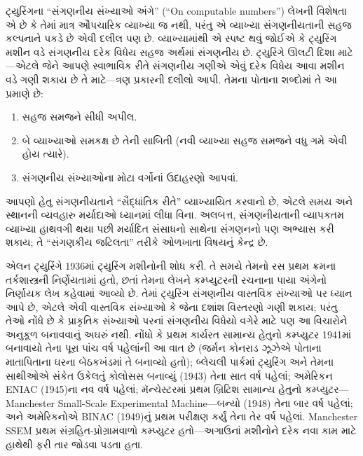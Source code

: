 \begin{digress}
ટ્યુરિંગના ``સંગણનીય સંખ્યાઓ અંગે'' (``On computable numbers'') લેખની
વિશેષતા એ છે કે તેમાં
માત્ર ઔપચારિક વ્યાખ્યા જ નથી, પરંતુ એ વ્યાખ્યા સંગણનીયતાની
સહજ કલ્પનાને પકડે છે એવી દલીલ પણ છે. વ્યાખ્યામાંથી એ સ્પષ્ટ
થવું જોઈએ કે ટ્યુરિંગ મશીન વડે સંગણનીય દરેક વિધેય સહજ અર્થમાં
સંગણનીય છે. ટ્યુરિંગે ઊલટી દિશા માટે---એટલે જેને આપણે
સ્વાભાવિક રીતે સંગણનીય ગણીએ એવું દરેક વિધેય આવા મશીન વડે
ગણી શકાય છે તે માટે---ત્રણ પ્રકારની દલીલો આપી. તેમના પોતાના
શબ્દોમાં તે આ પ્રમાણે છે:
\begin{enumerate}
\item સહજ સમજને સીધી અપીલ.
\item બે વ્યાખ્યાઓ સમકક્ષ છે તેની સાબિતી (નવી વ્યાખ્યા સહજ
  સમજને વધુ ગમે એવી હોય ત્યારે).
\item સંગણનીય સંખ્યાઓના મોટા વર્ગોનાં ઉદાહરણો આપવાં.
\end{enumerate}
આપણો હેતુ સંગણનીયતાને ``સૈદ્ધાંતિક રીતે'' વ્યાખ્યાયિત કરવાનો
છે, એટલે સમય અને સ્થાનની વ્યવહારુ મર્યાદાઓ ધ્યાનમાં લીધા
વિના. અલબત્ત, સંગણનીયતાની વ્યાપકતમ વ્યાખ્યા હાથવગી થયા
પછી મર્યાદિત સંસાધનો સાથેના સંગણનનો પણ અભ્યાસ કરી શકાય;
તે ``સંગણકીય જટિલતા'' તરીકે ઓળખાતા વિષયનું કેન્દ્ર છે.
\end{digress}

\begin{history}
એલન ટ્યુરિંગે 1936માં ટ્યુરિંગ મશીનોની શોધ કરી. તે સમયે તેમનો
રસ પ્રથમ ક્રમના તર્કશાસ્ત્રની નિર્ણેયતામાં હતો, છતાં તેમના
લેખને કમ્પ્યુટરની રચનાના પાયા અંગેનો નિર્ણાયક લેખ કહેવામાં
આવ્યો છે. તેમાં ટ્યુરિંગ સંગણનીય વાસ્તવિક સંખ્યાઓ પર ધ્યાન
આપે છે, એટલે એવી વાસ્તવિક સંખ્યાઓ કે જેના દશાંશ વિસ્તરણો
ગણી શકાય; પરંતુ તેઓ નોંધે છે કે પ્રાકૃતિક સંખ્યાઓ પરનાં
સંગણનીય વિધેયો વગેરે માટે પણ આ વિચારોને અનુકૂળ બનાવવાનું
અઘરું નથી. નોંધો કે પ્રથમ કાર્યરત સામાન્ય હેતુનો કમ્પ્યુટર
1941માં બનાવાયો તેના પૂરા પાંચ વર્ષ પહેલાંની આ વાત છે
(જર્મન કોનરાડ ઝૂઝેએ પોતાના માતાપિતાના ઘરના બેઠકખંડમાં તે
બનાવ્યો હતો); બ્લેચલી પાર્કમાં ટ્યુરિંગ અને તેમના સાથીઓએ
સંકેત ઉકેલતું કોલોસસ બનાવ્યું (1943) તેના સાત વર્ષ પહેલાં;
અમેરિકન ENIAC (1945)ના નવ વર્ષ પહેલાં; મૅન્ચેસ્ટરમાં પ્રથમ
બ્રિટિશ સામાન્ય હેતુનો કમ્પ્યુટર---Manchester Small-Scale
Experimental Machine---બન્યો (1948) તેના બાર વર્ષ પહેલાં;
અને અમેરિકનોએ BINAC (1949)નું પ્રથમ પરીક્ષણ કર્યું તેના તેર
વર્ષ પહેલાં. Manchester SSEM પ્રથમ સંગ્રહિત-પ્રોગ્રામવાળો
કમ્પ્યુટર હતો---અગાઉનાં મશીનોને દરેક નવા કામ માટે હાથેથી
ફરી તાર જોડવા પડતા હતા.
\end{history}
\endgroup


\begingroup
\makeatletter{}\makeatother


